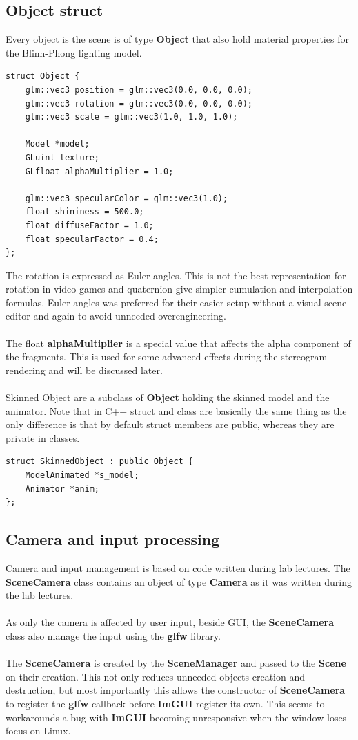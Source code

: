 \documentclass[12pt, a4paper]{article}
\begin{document}
\subsection{Object struct}
Every object is the scene is of type \textbf{Object} that also hold material properties for the Blinn-Phong lighting model.
\begin{lstlisting}[caption={Object struct},captionpos=b]
struct Object {
    glm::vec3 position = glm::vec3(0.0, 0.0, 0.0);
    glm::vec3 rotation = glm::vec3(0.0, 0.0, 0.0);
    glm::vec3 scale = glm::vec3(1.0, 1.0, 1.0);

    Model *model;
    GLuint texture;
    GLfloat alphaMultiplier = 1.0;

    glm::vec3 specularColor = glm::vec3(1.0);
    float shininess = 500.0;
    float diffuseFactor = 1.0;
    float specularFactor = 0.4;
};
\end{lstlisting}
The rotation is expressed as Euler angles. This is not the best representation for rotation in video games and quaternion
give simpler cumulation and interpolation formulas. Euler angles was preferred for their easier setup without a visual
scene editor and again to avoid unneeded overengineering.\\\\
The float \textbf{alphaMultiplier} is a special value that affects the alpha component of the fragments.
This is used for some advanced effects during the stereogram rendering and will be discussed later.\\\\
Skinned Object are a subclass of \textbf{Object} holding the skinned model and the animator. Note that in C++ struct and class
are basically the same thing as the only difference is that by default struct members are public, whereas they are private in classes.
\begin{lstlisting}[caption={SkinnedObject struct},captionpos=b]
struct SkinnedObject : public Object {
    ModelAnimated *s_model;
    Animator *anim;
};
\end{lstlisting}

\subsection{Camera and input processing}
Camera and input management is based on code written during lab lectures. The \textbf{SceneCamera} class contains
an object of type \textbf{Camera} as it was written during the lab lectures.\\\\
As only the camera is affected by user input, beside GUI, the \textbf{SceneCamera} class also manage the input
using the \textbf{glfw} library.\\\\
The \textbf{SceneCamera} is created by the \textbf{SceneManager} and passed to the \textbf{Scene} on
their creation. This not only reduces unneeded objects creation and destruction, but most importantly this allows
the constructor of \textbf{SceneCamera} to register the \textbf{glfw} callback before \textbf{ImGUI} register its own.
This seems to workarounds a bug with \textbf{ImGUI} becoming unresponsive when the window loses focus on Linux.  
\end{document}
